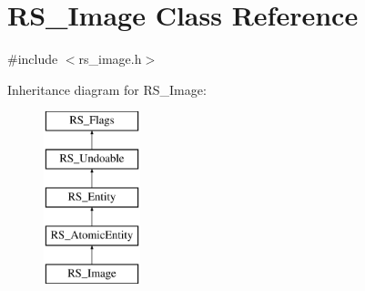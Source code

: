 \hypertarget{classRS__Image}{\section{R\-S\-\_\-\-Image Class Reference}
\label{classRS__Image}
}


{\ttfamily \#include $<$rs\-\_\-image.\-h$>$}

Inheritance diagram for R\-S\-\_\-\-Image\-:\begin{figure}[H]
\begin{center}
\leavevmode
\includegraphics[height=5.000000cm]{classRS__Image}
\end{center}
\end{figure}
